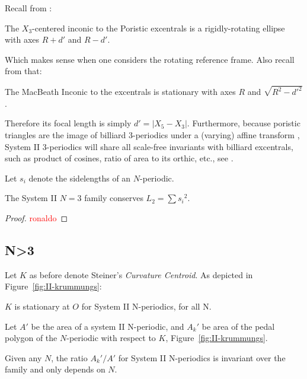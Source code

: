 Recall from \cite[Thm 2]{garcia2020-poristic}:

\begin{obs}
The $X_3$-centered inconic to the Poristic excentrals is a rigidly-rotating ellipse with axes $R+d'$ and $R-d'$.
\end{obs}

Which makes sense when one considers the rotating reference frame. Also recall from \cite[Thm 1]{garcia2020-poristic} that:

\begin{obs}
The MacBeath Inconic to the excentrals is stationary with axes $R$ and $\sqrt{R^2-d'^2}$.
\end{obs}

Therefore its focal length is simply $d'=|X_5-X_3|$. Furthermore, because poristic triangles are the image of billiard 3-periodics under a (varying) affine transform \cite[Thm 4]{garcia2020-poristic}, System II 3-periodics will share all scale-free invariants with billiard excentrals, such as product of cosines, ratio of area to its orthic, etc., see \cite{reznik2020-forty}.

Let $s_i$ denote the sidelengths of an $N$-periodic.

\begin{proposition}
The System II $N=3$ family conserves $L_2=\sum{s_i}^2$.
\end{proposition}

\begin{proof}
\textcolor{red}{ronaldo}
\end{proof}

\subsection*{N>3}

Let $K$ as before denote Steiner's {\em Curvature Centroid}. As depicted in Figure~\ref{fig:II-krummungs}:

\begin{conjecture}
$K$ is stationary at $O$ for System II N-periodics, for all N.
\end{conjecture}

Let $A'$ be the area of a system II N-periodic, and $A_k'$ be area of the pedal polygon of the $N$-periodic with respect to $K$, Figure~\ref{fig:II-krummungs}.

\begin{conjecture}
Given any $N$, the ratio $A_k'/A'$ for System II N-periodics is invariant over the family and only depends on $N$.
\end{conjecture}

